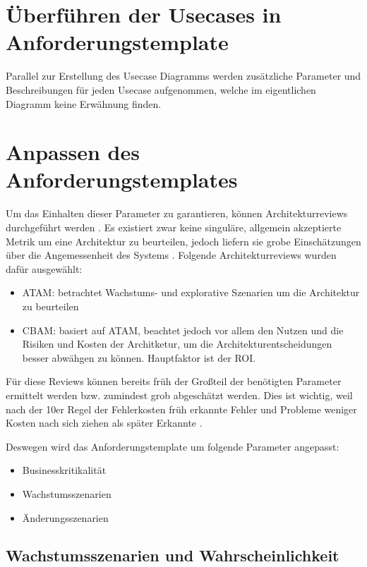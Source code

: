 \section{Überführen der Usecases in Anforderungstemplate}
Parallel zur Erstellung des Usecase Diagramms werden zusätzliche Parameter und Beschreibungen für jeden Usecase aufgenommen, welche im eigentlichen Diagramm keine Erwähnung finden.

\section{Anpassen des Anforderungstemplates}
Um das Einhalten dieser Parameter zu garantieren, können Architekturreviews durchgeführt werden \cite[S. 20]{review}. Es existiert zwar \glqq keine singuläre, allgemein akzeptierte Metrik um eine Architektur zu beurteilen\grqq \cite[S. 19]{review}, jedoch liefern sie grobe Einschätzungen über die Angemessenheit des Systems \cite[S. 20]{review}. Folgende Architekturreviews wurden dafür ausgewählt:

\begin{itemize}
  \item ATAM: betrachtet Wachstums- und explorative Szenarien um die Architektur zu beurteilen \cite[S. 61]{review}
  \item CBAM: basiert auf ATAM, beachtet jedoch vor allem den Nutzen und die Risiken und Kosten der Architketur, um die Architekturentscheidungen besser abwähgen zu können. Hauptfaktor ist der ROI. \cite[S. 67]{review}
\end{itemize}

Für diese Reviews können bereits früh der Großteil der benötigten Parameter ermittelt werden bzw. zumindest grob abgeschätzt werden. Dies ist wichtig, weil nach der 10er Regel der Fehlerkosten früh erkannte Fehler und Probleme weniger Kosten nach sich ziehen als später Erkannte \cite[S. 154]{fehler}.

Deswegen wird das Anforderungstemplate um folgende Parameter angepasst:

\begin{itemize}
  \item Businesskritikalität
  \item Wachstumsszenarien
  \item Änderungsszenarien
\end{itemize}

\subsection{Wachstumsszenarien und Wahrscheinlichkeit}
